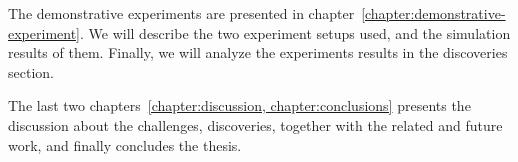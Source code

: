 The demonstrative experiments are presented in chapter~\ref{chapter:demonstrative-experiment}. We will describe the two experiment setups used, and the simulation results of them. Finally, we will analyze the experiments results in the discoveries section.

The last two chapters~\ref{chapter:discussion, chapter:conclusions} presents the discussion about the challenges, discoveries, together with the related and future work,  and finally concludes the thesis.

